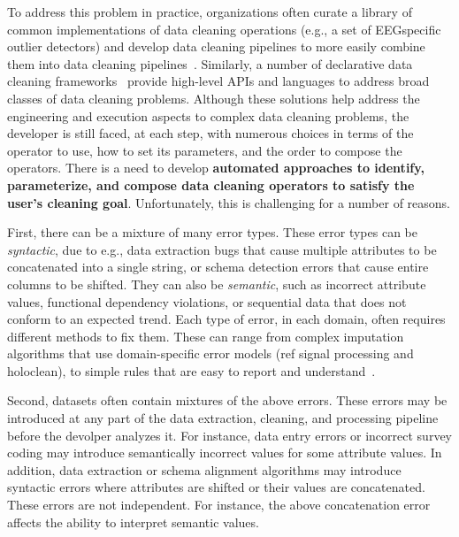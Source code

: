 To address this problem in practice, organizations often curate a library of common implementations of data cleaning operations (e.g., a set of EEGspecific outlier detectors) and develop data cleaning pipelines to more easily combine them into data cleaning pipelines~\cite{krishnan2016hilda}.  Similarly, a number of declarative data cleaning frameworks~\cite{DBLP:journals/pvldb/HaasKWF015,gokhale2014corleone,stonebraker2013data,giannakopoulou2017cleanm} provide high-level APIs and languages to address broad classes of data cleaning problems.  Although these solutions help address the engineering and execution aspects to complex data cleaning problems, the developer is still faced, at each step, with numerous choices in terms of the operator to use, how to set its parameters, and the order to compose the operators.  There is a need to develop \textbf{automated approaches to identify, parameterize, and compose data cleaning operators to satisfy the user's cleaning goal}.  Unfortunately, this is challenging for a number of reasons.




First, there can be a mixture of many error types.    These error types can be {\it syntactic}, due to e.g., data extraction bugs that cause multiple attributes to be concatenated into a single string, or schema detection errors that cause entire columns to be shifted.  They can also be {\it semantic}, such as incorrect attribute values, functional dependency violations, or sequential data that does not conform to an expected trend.   Each type of error, in each domain, often requires different methods to fix them.  These can range from complex imputation algorithms that use domain-specific error models (ref signal processing and holoclean), to simple rules that are easy to report and understand~\cite{}.  

Second, datasets often contain mixtures of the above errors.  These errors may be introduced at any part of the data extraction, cleaning, and processing pipeline before the devolper analyzes it.  For instance, data entry errors or incorrect survey coding may introduce semantically incorrect values for some attribute values.  In addition, data extraction or schema alignment algorithms may introduce syntactic errors where attributes are shifted or their values are concatenated.  These errors are not independent. For instance, the above concatenation error affects the ability to interpret semantic values.  

